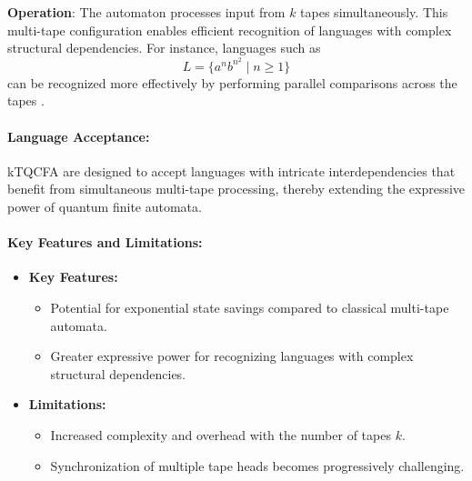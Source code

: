 \textbf{Operation}:  
The automaton processes input from \( k \) tapes simultaneously. This multi-tape configuration enables efficient recognition of languages with complex structural dependencies. For instance, languages such as 
\[
L = \{a^n b^{n^2} \mid n \geq 1\}
\]
can be recognized more effectively by performing parallel comparisons across the tapes \cite{zheng2012two}.

\paragraph{Language Acceptance:}  
kTQCFA are designed to accept languages with intricate interdependencies that benefit from simultaneous multi-tape processing, thereby extending the expressive power of quantum finite automata.

\paragraph{Key Features and Limitations:}
\begin{itemize}
    \item \textbf{Key Features:}
    \begin{itemize}
        \item Potential for exponential state savings compared to classical multi-tape automata.
        \item Greater expressive power for recognizing languages with complex structural dependencies.
    \end{itemize}
    \item \textbf{Limitations:}
    \begin{itemize}
        \item Increased complexity and overhead with the number of tapes \( k \).
        \item Synchronization of multiple tape heads becomes progressively challenging.
    \end{itemize}
\end{itemize}

